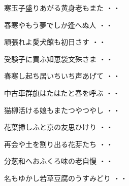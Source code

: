 \vspace{0.6cm}
\begin{shiika}寒玉子盛りあがる黄身老もまた
\hfill{・・}\end{shiika}
\vspace{0.6cm}
\begin{shiika}春寒やもう夢でしか逢へぬ人
\hfill{・・}\end{shiika}
\vspace{0.6cm}
\begin{shiika}頑張れよ愛犬館も初日さす
\hfill{・・}\end{shiika}
\vspace{0.6cm}
\begin{shiika}受験子に買ふ知恵袋文殊さま
\hfill{・・}\end{shiika}
\vspace{0.6cm}
\begin{shiika}春寒し起ち居いちいち声あげて
\hfill{・・}\end{shiika}
\vspace{0.6cm}
\begin{shiika}中古車群旗はたはたと春を呼ぶ
\hfill{・・}\end{shiika}
\vspace{0.6cm}
\begin{shiika}猫柳活ける娘もまたつやつやし
\hfill{・・}\end{shiika}
\vspace{0.6cm}
\begin{shiika}花葉挿しふと京の友思ひけり
\hfill{・・}\end{shiika}
\vspace{0.6cm}
\begin{shiika}再会や土を割り出る花芽たち
\hfill{・・}\end{shiika}
\vspace{0.6cm}
\begin{shiika}分葱和へおふくろ味の老自慢
\hfill{・・}\end{shiika}
\vspace{0.6cm}
\begin{shiika}名もゆかし若草豆腐のうすみどり
\hfill{・・}\end{shiika}

